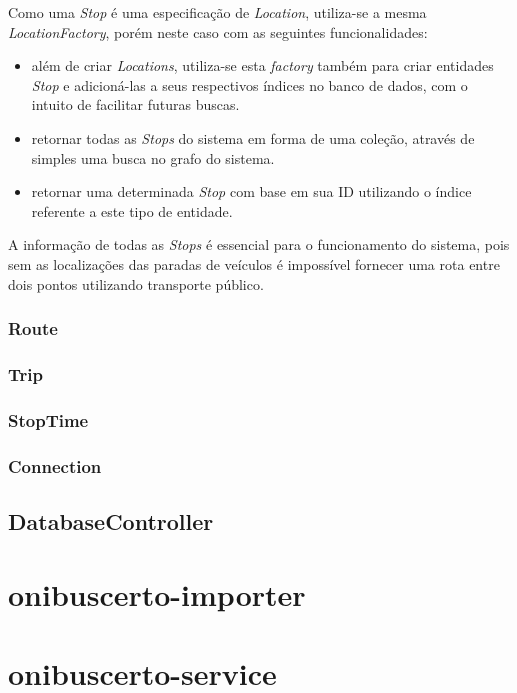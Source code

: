 Como uma \emph{Stop} é uma especificação de \emph{Location}, utiliza-se a mesma \emph{LocationFactory}, porém neste caso com as seguintes funcionalidades:
\begin{itemize}
	\item além de criar \emph{Locations}, utiliza-se esta \emph{factory} também para criar entidades \emph{Stop} e adicioná-las a seus respectivos índices no banco 		de dados, com o intuito de facilitar futuras buscas.
	\item retornar todas as \emph{Stops} do sistema em forma de uma coleção, através de simples uma busca no grafo do sistema.
	\item retornar uma determinada \emph{Stop} com base em sua ID utilizando o índice referente a este tipo de entidade.
\end{itemize}

A informação de todas as \emph{Stops} é essencial para o funcionamento do sistema, pois sem as localizações das paradas de veículos é impossível fornecer uma rota entre dois pontos utilizando transporte público.

\subsubsection{Route}

\subsubsection{Trip}

\subsubsection{StopTime}

\subsubsection{Connection}
\label{conn}

\subsection{DatabaseController}


\section{onibuscerto-importer}

\section{onibuscerto-service}

